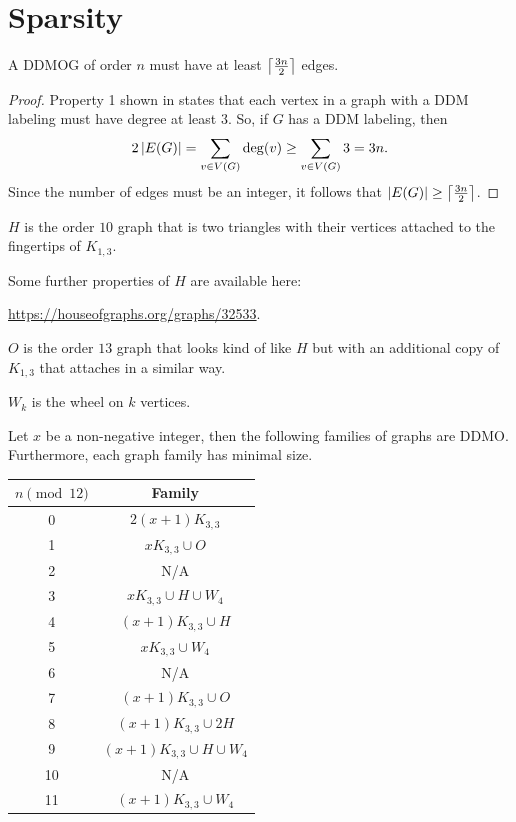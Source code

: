 \section{Sparsity}

\begin{proposition}
    A DDMOG of order \(n\) must have at least \(\left\lceil \frac{3n}{2} \right\rceil\) edges.
\end{proposition}
\begin{proof}
    Property 1 shown in \cite{altmanDifferenceDistanceMagic2024} states that each vertex in a graph
    with a DDM labeling must have degree at least \(3\).
    So, if \(G\) has a DDM labeling, then
    \[
    2\left| E(G) \right| = \sum_{v \in V(G)} \deg(v) \ge \sum_{v \in V(G)} 3 = 3n.
    \]
    Since the number of edges must be an integer, it follows that
    \(\left| E(G) \right| \ge \left\lceil \frac{3n}{2} \right\rceil\).
\end{proof}


\begin{definition}
    \(H\) is the order \(10\) graph
    that is two triangles with their vertices attached to the fingertips of \(K_{1,3}\).
\end{definition}
Some further properties of \(H\) are available here: 

\url{https://houseofgraphs.org/graphs/32533}.


\begin{definition}
    \(O\) is the order \(13\) graph
    that looks kind of like \(H\) but with an additional copy of \(K_{1,3}\)
    that attaches in a similar way.
\end{definition}

\begin{definition}
    \(W_k\) is the wheel on \(k\) vertices.
\end{definition}

\begin{conjecture}
    Let \(x\) be a non-negative integer,
    then the following families of graphs are DDMO.
    Furthermore, each graph family has minimal size.

\begin{tabular}{c | c }
\(n \pmod{12}\) & Family \\
\hline
0 & \(2(x + 1) K_{3,3}\) \\
1 & \(xK_{3,3}\cup O\) \\
2 & N/A \\
3 & \(x K_{3,3} \cup H \cup W_4\) \\
4 & \((x+1) K_{3,3} \cup H\) \\
5 & \(x K_{3,3} \cup W_4\) \\
6 & N/A \\
7 & \((x+1) K_{3,3}\cup O\) \\
8 & \((x+1) K_{3,3} \cup 2H\) \\
9 & \((x+1) K_{3,3} \cup H \cup W_4\) \\
10 & N/A \\
11 & \((x+1) K_{3,3} \cup W_4\)
\end{tabular}
\end{conjecture}

